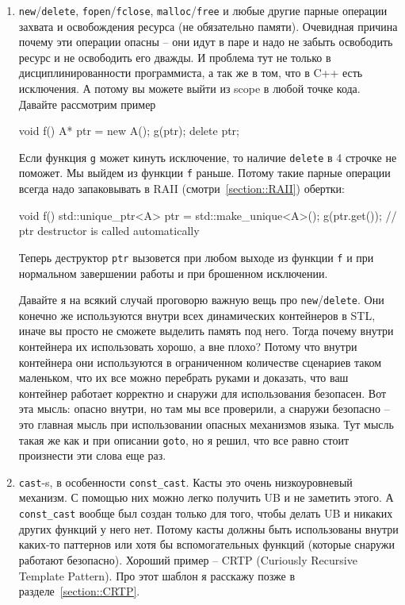 \begin{enumerate}
\item \verb"new"/\verb"delete", \verb"fopen"/\verb"fclose", \verb"malloc"/\verb"free" и любые другие парные операции захвата и освобождения ресурса (не обязательно памяти).
Очевидная причина почему эти операции опасны -- они идут в паре и надо не забыть освободить ресурс и не освободить его дважды.
И проблема тут не только в дисциплинированности программиста, а так же в том, что в C++ есть исключения.
А потому вы можете выйти из scope в любой точке кода.
Давайте рассмотрим пример
\begin{cppcode}
void f() {
  A* ptr = new A();
  g(ptr);
  delete ptr;
}
\end{cppcode}
Если функция \verb"g" может кинуть исключение, то наличие \verb"delete" в 4 строчке не поможет.
Мы выйдем из функции \verb"f" раньше.
Потому такие парные операции всегда надо запаковывать в RAII (смотри~\ref{section::RAII}) обертки:
\begin{cppcode}
void f() {
  std::unique_ptr<A> ptr = std::make_unique<A>();
  g(ptr.get());
} // ptr destructor is called automatically
\end{cppcode}
Теперь деструктор \verb"ptr" вызовется при любом выходе из функции \verb"f" и при нормальном завершении работы и при брошенном исключении.

Давайте я на всякий случай проговорю важную вещь про \verb"new"/\verb"delete".
Они конечно же используются внутри всех динамических контейнеров в STL, иначе вы просто не сможете выделить память под него.
Тогда почему внутри контейнера их использовать хорошо, а вне плохо?
Потому что внутри контейнера они используются в ограниченном количестве сценариев таком маленьком, что их все можно перебрать руками и доказать, что ваш контейнер работает корректно и снаружи для использования безопасен.
Вот эта мысль: опасно внутри, но там мы все проверили, а снаружи безопасно -- это главная мысль при использовании опасных механизмов языка.
Тут мысль такая же как и при описании \verb"goto", но я решил, что все равно стоит произнести эти слова еще раз.

\item \verb"cast"-s, в особенности \verb"const_cast".
Касты это очень низкоуровневый механизм.
С помощью них можно легко получить UB и не заметить этого.
А \verb"const_cast" вообще был создан только для того, чтобы делать UB и никаких других функций у него нет.
Потому касты должны быть использованы внутри каких-то паттернов или хотя бы вспомогательных функций (которые снаружи работают безопасно).
Хороший пример -- CRTP (Curiously Recursive Template Pattern).
Про этот шаблон я расскажу позже в разделе~\ref{section::CRTP}.


\end{enumerate}
